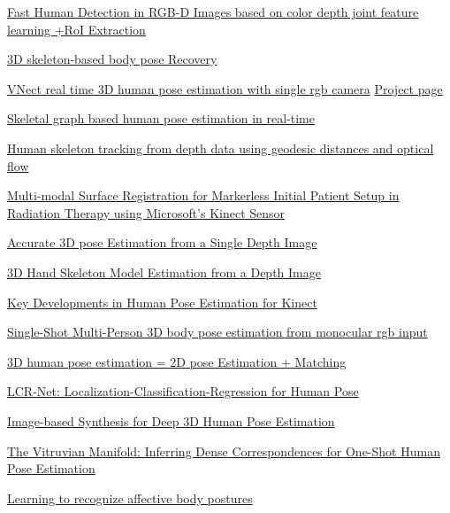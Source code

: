 \href{http://media.cs.tsinghua.edu.cn/~imagevision/papers/\%5B2016\%5D0000266-HuZhan-ICIP2016.pdf}{Fast Human Detection in RGB-D Images based on color depth joint feature learning +RoI Extraction}

\href{https://hal.inria.fr/inria-00590212/file/3dpvt-skeleton.pdf}{3D skeleton-based body pose Recovery}

\href{https://arxiv.org/pdf/1705.01583.pdf}{VNect real time 3D human pose estimation with single rgb camera}
\href{http://gvv.mpi-inf.mpg.de/projects/VNect/}{Project page}

\href{http://www.reactivereality.com/static/pdf/paper69.pdf}{Skeletal graph based human pose estimation in real-time}

\href{https://www.sciencedirect.com/science/article/pii/S026288561100134X}{Human skeleton tracking from depth data using geodesic distances and optical flow}

\href{http://citeseerx.ist.psu.edu/viewdoc/download?doi=10.1.1.642.3647&rep=rep1&type=pdf}{Multi-modal Surface Registration for Markerless Initial Patient Setup in Radiation Therapy using Microsoft’s Kinect Sensor}

\href{https://ieeexplore.ieee.org/stamp/stamp.jsp?tp=&arnumber=6126310&tag=1}{Accurate 3D pose Estimation from a Single Depth Image}

\href{http://www.mva-org.jp/Proceedings/2015USB/papers/14-18.pdf}{3D Hand Skeleton Model Estimation from a Depth Image}

\href{https://www.microsoft.com/en-us/research/wp-content/uploads/2016/02/ks_book_2012.pdf}{Key Developments in Human Pose Estimation for Kinect}

\href{https://arxiv.org/pdf/1712.03453.pdf}{Single-Shot Multi-Person 3D body pose estimation from monocular rgb input}

\href{https://arxiv.org/pdf/1612.06524.pdf}{3D human pose estimation = 2D pose Estimation + Matching}

\href{https://hal.inria.fr/hal-01505085/document}{LCR-Net: Localization-Classification-Regression for Human Pose}

\href{https://arxiv.org/pdf/1802.04216.pdf}{Image-based Synthesis for Deep 3D Human Pose Estimation}

\href{http://www.cs.toronto.edu/~jtaylor/papers/cvpr2012.pdf}{The Vitruvian Manifold: Inferring Dense Correspondences for One-Shot Human Pose Estimation}

\href{https://ieeexplore.ieee.org/document/1227226/?reload=true}{Learning to recognize affective body postures}

